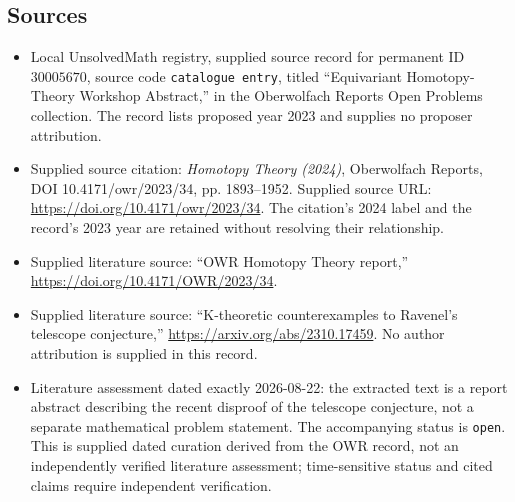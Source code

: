 \documentclass[11pt]{article}
\begin{document}
\subsection{Sources}
\begin{itemize}
\item Local UnsolvedMath registry, supplied source record for permanent ID \(30005670\), source code \texttt{catalogue entry}, titled ``Equivariant Homotopy-Theory Workshop Abstract,'' in the Oberwolfach Reports Open Problems collection. The record lists proposed year 2023 and supplies no proposer attribution.
\item Supplied source citation: \emph{Homotopy Theory (2024)}, Oberwolfach Reports, DOI 10.4171/owr/2023/34, pp. 1893--1952. Supplied source URL: \url{https://doi.org/10.4171/owr/2023/34}. The citation's 2024 label and the record's 2023 year are retained without resolving their relationship.
\item Supplied literature source: ``OWR Homotopy Theory report,'' \url{https://doi.org/10.4171/OWR/2023/34}.
\item Supplied literature source: ``K-theoretic counterexamples to Ravenel's telescope conjecture,'' \url{https://arxiv.org/abs/2310.17459}. No author attribution is supplied in this record.
\item Literature assessment dated exactly 2026-08-22: the extracted text is a report abstract describing the recent disproof of the telescope conjecture, not a separate mathematical problem statement. The accompanying status is \texttt{open}. This is supplied dated curation derived from the OWR record, not an independently verified literature assessment; time-sensitive status and cited claims require independent verification.
\end{itemize}
\end{document}
